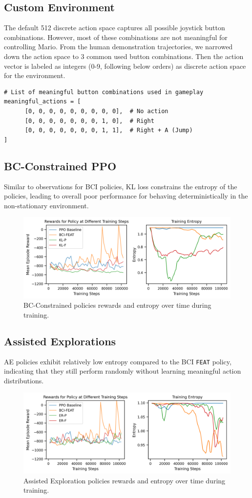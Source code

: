 \documentclass{article}
\begin{document}
\subsection{Custom Environment}
\label{a1:custom_env}

The default 512 discrete action space captures all possible joystick button 
combinations. However, most of these combinations are not meaningful for 
controlling Mario. From the human demonstration trajectories, we narrowed down 
the action space to 3 common used button combinations.
Then the action vector is labeled as integers (0-9, following below orders)
as discrete action space for the environment.

\begin{verbatim}
# List of meaningful button combinations used in gameplay
meaningful_actions = [
      [0, 0, 0, 0, 0, 0, 0, 0, 0],  # No action
      [0, 0, 0, 0, 0, 0, 0, 1, 0],  # Right
      [0, 0, 0, 0, 0, 0, 0, 1, 1],  # Right + A (Jump)
]
\end{verbatim}

\subsection{BC-Constrained PPO}

Similar to observations for BCI policies, KL loss constrains the 
entropy of the policies, leading to overall poor performance for behaving 
deterministically in the non-stationary environment.

\begin{figure}[h]
      \centering
      \includegraphics[width=0.7\columnwidth]{figures/bcc-training.png}
      \caption{BC-Constrained policies rewards and entropy over time during
      training.}
      \label{fig:res_bcc_deepdive}
\end{figure}

\subsection{Assisted Explorations}

AE policies exhibit relatively low entropy compared to the BCI \texttt{FEAT} 
policy, indicating that they still perform randomly without learning 
meaningful action distributions.

\begin{figure}[h]
      \centering
      \includegraphics[width=0.7\columnwidth]{figures/ae-training.png}
      \caption{Assisted Exploration policies rewards and entropy over time during
      training.}
      \label{fig:res_ae_deepdive}
\end{figure}
\end{document}
